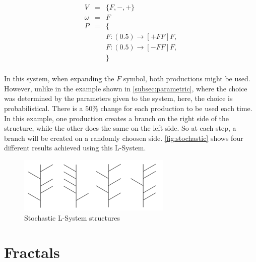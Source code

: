 \documentclass{acmtog}
\begin{document}
\begin{eqnarray}
  V       &=& \{F, -, +\}                   \nonumber \\
  \omega  &=& F                             \nonumber \\
  P       &=& \{                            \nonumber \\
          & & F : (0.5) \rightarrow [+FF]F, \nonumber \\
          & & F : (0.5) \rightarrow [-FF]F, \nonumber \\
          & & \}                            \nonumber \\
\end{eqnarray}

In this system, when expanding the $F$ symbol, both productions might be used. However, unlike in the example shown in \autoref{subsec:parametric}, where the choice was determined by the parameters given to the system, here, the choice is probabilistical. There is a $50\%$ change for each production to be used each time. In this example, one production creates a branch on the right side of the structure, while the other does the same on the left side. So at each step, a branch will be created on a randomly choosen side. \autoref{fig:stochastic} shows four different results achieved using this L-System.

\begin{figure}[!htp]
  \begin{center}
    \includegraphics[width=0.6\columnwidth]{images/4_stochastic}
    \caption{Stochastic L-System structures \label{fig:stochastic}}
    \end{center}
\end{figure}





\section{Fractals}
\label{sec:fractals}
\end{document}
